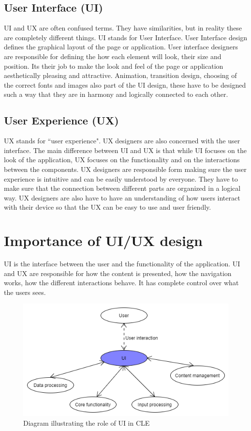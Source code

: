 \documentclass[10pt,english,a4paper]{article}
\begin{document}
\subsection{User Interface (UI)}
UI and UX are often confused terms\cite{theymakedesign_2019_what}. They have similarities, but in reality
these are completely different things.
UI stands for User Interface. User Interface design defines the graphical layout of the page or application.
User interface designers are responsible for defining the how each element will look, their size and position.
Its their job to make the look and feel of the page or application aesthetically pleasing and 
attractive. Animation, transition design, choosing of the correct fonts and images also part of the UI design, 
these have to be designed such a way that they are in harmony and logically connected to each other\cite{theymakedesign_2019_what}.


\subsection{User Experience (UX)}
UX stands for ``user experience". UX designers are also concerned with the user interface\cite{theymakedesign_2019_what}. 
The main difference between UI and UX is that while UI focuses on the look of the application,
UX focuses on the functionality and on the interactions between the components. UX designers are 
responsible form making sure the user experience is intuitive and can be easily understood by everyone.
They have to make sure that the connection between different parts are organized in a logical way.
UX designers are also have to have an understanding of how users interact with their
device so that the UX can be easy to use and user friendly\cite{theymakedesign_2019_what}. 

\section{Importance of UI/UX design}\label{importance}
UI is the interface between the user and the functionality of the application. UI and UX are responsible for
how the content is presented, how the navigation works, how the different interactions behave. It 
has complete control over what the users sees.
\begin{figure}[H]
    \centering
    \includegraphics[width=1\textwidth]{images/ui-diagram2.png}
    \caption{Diagram illustrating the role of UI in CLE}
\end{figure}
\end{document}
